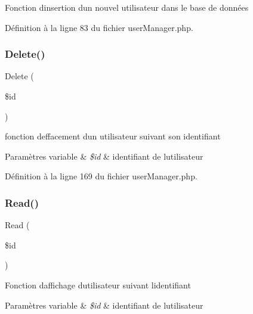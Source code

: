 Fonction d\textquotesingle{}insertion d\textquotesingle{}un nouvel utilisateur dans le base de données 

Définition à la ligne 83 du fichier user\+Manager.\+php.

\mbox{\label{class_src_1_1_managers_1_1user_manager_a59113b5ecd1d155db6a4f30af34a1e80}} 
\subsubsection{\texorpdfstring{Delete()}{Delete()}}
{\footnotesize\ttfamily Delete (\begin{DoxyParamCaption}\item[{}]{\$id }\end{DoxyParamCaption})}

fonction d\textquotesingle{}effacement d\textquotesingle{}un utilisateur suivant son identifiant 
\begin{DoxyParams}[1]{Paramètres}
variable & {\em \$id} & identifiant de l\textquotesingle{}utilisateur \\
\hline
\end{DoxyParams}


Définition à la ligne 169 du fichier user\+Manager.\+php.

\mbox{\label{class_src_1_1_managers_1_1user_manager_ad2bbc9b3130abdfe3a9fc9e9fe36716f}} 
\subsubsection{\texorpdfstring{Read()}{Read()}}
{\footnotesize\ttfamily Read (\begin{DoxyParamCaption}\item[{}]{\$id }\end{DoxyParamCaption})}

Fonction d\textquotesingle{}affichage d\textquotesingle{}utilisateur suivant l\textquotesingle{}identifiant 
\begin{DoxyParams}[1]{Paramètres}
variable & {\em \$id} & identifiant de l\textquotesingle{}utilisateur \\
\hline
\end{DoxyParams}


